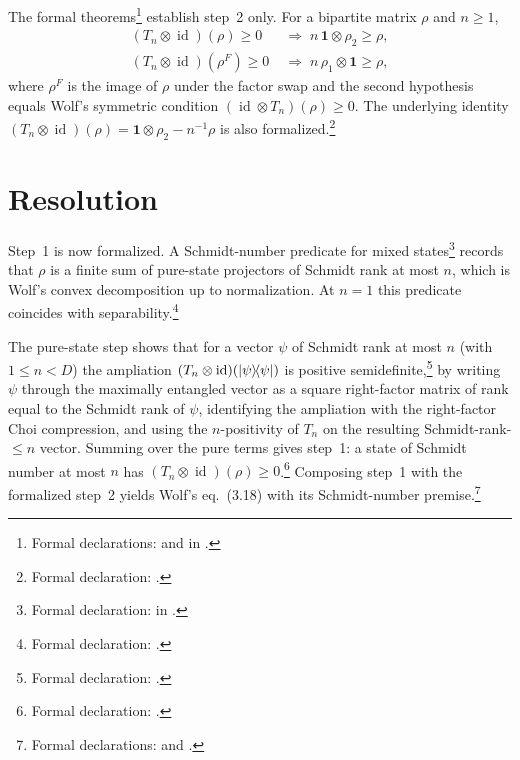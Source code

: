 \documentclass{article}
\begin{document}
The formal theorems\footnote{Formal declarations:
     and
     in
    .} establish step~2 only. For a
bipartite matrix $\rho$ and $n\ge 1$,
\begin{align}
  (T_n\otimes\operatorname{id})(\rho)\ge 0
  &\;\Longrightarrow\;
  n\,\mathbf 1\otimes\rho_2\ge\rho,\\
  (T_n\otimes\operatorname{id})(\rho^{F})\ge 0
  &\;\Longrightarrow\;
  n\,\rho_1\otimes\mathbf 1\ge\rho,
\end{align}
where $\rho^{F}$ is the image of $\rho$ under the factor swap and the second
hypothesis equals Wolf's symmetric condition $(\operatorname{id}\otimes T_n)(\rho)\ge 0$. The
underlying identity $(T_n\otimes\operatorname{id})(\rho)=\mathbf 1\otimes\rho_2-n^{-1}\rho$ is
also formalized.\footnote{Formal declaration:
    .}

\section{Resolution}

Step~1 is now formalized. A Schmidt-number predicate for mixed
states\footnote{Formal declaration:  in
    .} records that $\rho$ is a finite sum
of pure-state projectors of Schmidt rank at most $n$, which is Wolf's convex
decomposition up to normalization. At $n=1$ this predicate coincides with
separability.\footnote{Formal declaration:
    .}

The pure-state step shows that for a vector $\psi$ of Schmidt rank at most $n$
(with $1\le n<D$) the ampliation $(T_n\otimes\operatorname{id})(|\psi\rangle\!\langle \psi|)$ is positive
semidefinite,\footnote{Formal declaration:
    .} by writing
$\psi$ through the maximally entangled vector as a square right-factor matrix of
rank equal to the Schmidt rank of $\psi$, identifying the ampliation with the
right-factor Choi compression, and using the $n$-positivity of $T_n$ on the
resulting Schmidt-rank-$\le n$ vector. Summing over the pure terms gives step~1:
a state of Schmidt number at most $n$ has
$(T_n\otimes\operatorname{id})(\rho)\ge 0$.\footnote{Formal declaration:
    .} Composing
step~1 with the formalized step~2 yields Wolf's eq.~(3.18) with its
Schmidt-number premise.\footnote{Formal declarations:
     and
    .}
\end{document}
